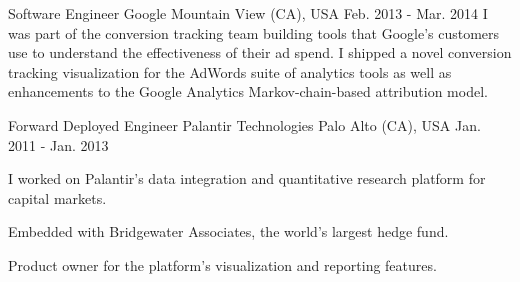 \begin{cventries}
  \cventry
    {Software Engineer} %
    {Google} %
    {Mountain View (CA), USA} %
    {Feb. 2013 - Mar. 2014} %
    {
      I was part of the conversion tracking team building tools that Google's customers use to understand the effectiveness of their ad spend. I shipped a novel conversion tracking visualization for the AdWords suite of analytics tools as well as enhancements to the Google Analytics Markov-chain-based attribution model.
      \vspace{3.0mm}
    }

  \cventry
    {Forward Deployed Engineer} %
    {Palantir Technologies} %
    {Palo Alto (CA), USA} %
    {Jan. 2011 - Jan. 2013} %
    {
      I worked on Palantir's data integration and quantitative research platform for capital markets.
    \vspace{5.0mm}
      \begin{cvitems} %
        \item {Embedded with Bridgewater Associates, the world's largest hedge fund.}
        \item {Product owner for the platform's visualization and reporting features.}
      \end{cvitems}
    }

\end{cventries}
